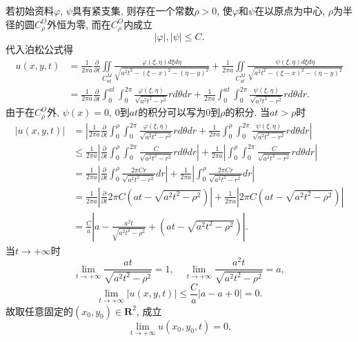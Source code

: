 \documentclass[11pt,a4paper]{article}
\begin{document}
若初始资料$\varphi$, $\psi$具有紧支集, 则存在一个常数$\rho>0$, 使$\varphi$和$\psi$在以原点为中心, $\rho$为半径的圆$C_\rho^O$外恒为零, 而在$C_\rho^O$内成立
$$|\varphi|,|\psi|\leqslant C.$$
代入泊松公式得
\begin{align*}
  u(x,y,t)
   & =\frac{1}{2\pi a}\frac{\partial}{\partial t}\iint\limits_{C_{at}^M}\frac{\varphi(\xi,\eta)d\xi d\eta}{\sqrt{a^2t^2-(\xi-x)^2-(\eta-y)^2}}+
  \frac{1}{2\pi a}\iint\limits_{C_{at}^M}\frac{\psi(\xi,\eta)d\xi d\eta}{\sqrt{a^2t^2-(\xi-x)^2-(\eta-y)^2}}                                    \\
   & =\frac{1}{2\pi a}\frac{\partial}{\partial t}\int_0^{at}\int_0^{2\pi}\frac{\varphi(\xi,\eta)}{\sqrt{a^2t^2-r^2}}rd\theta dr+
  \frac{1}{2\pi a}\int_0^{at}\int_0^{2\pi}\frac{\psi(\xi,\eta)}{\sqrt{a^2t^2-r^2}}rd\theta dr.
\end{align*}
由于在$C_\rho^O$外, $\psi(x)=0$, $0$到$at$的积分可以写为$0$到$\rho$的积分. 当$at>\rho$时
\begin{align*}
  |u(x,y,t)|
   & =\left|\frac{1}{2\pi a}\frac{\partial}{\partial t}\int_0^{\rho}\int_0^{2\pi}\frac{\varphi(\xi,\eta)}{\sqrt{a^2t^2-r^2}}rd\theta dr+
  \frac{1}{2\pi a}\int_0^{\rho}\int_0^{2\pi}\frac{\psi(\xi,\eta)}{\sqrt{a^2t^2-r^2}}rd\theta dr\right|                                                                           \\
   & \leqslant\frac{1}{2\pi a}\left|\frac{\partial}{\partial t}\int_0^{\rho}\int_0^{2\pi}\frac{C}{\sqrt{a^2t^2-r^2}}rd\theta dr\right|+
  \frac{1}{2\pi a}\left|\int_0^{\rho}\int_0^{2\pi}\frac{C}{\sqrt{a^2t^2-r^2}}rd\theta dr \right|                                                                                 \\
   & =\frac{1}{2\pi a}\left|\frac{\partial}{\partial t}\int_0^{\rho}\frac{2\pi Cr}{\sqrt{a^2t^2-r^2}}dr\right|+
  \frac{1}{2\pi a}\left|\int_0^{\rho}\frac{2\pi Cr}{\sqrt{a^2t^2-r^2}}dr \right|                                                                                                 \\
   & =\frac{1}{2\pi a}\left|\frac{\partial}{\partial t}2\pi C\left(at-\sqrt{a^2t^2-\rho^2}\right)\right|+\frac{1}{2\pi a}\left|2\pi C\left(at-\sqrt{a^2t^2-\rho^2}\right)\right| \\
   & =\frac{C}{a}\left|a-\frac{a^2t}{\sqrt{a^2t^2-\rho^2}}+\left(at-\sqrt{a^2t^2-\rho^2}\right)\right|.
\end{align*}
当$t\to+\infty$时
$$\lim_{t\to+\infty}\frac{at}{\sqrt{a^2t^2-\rho^2}}=1,\quad \lim_{t\to+\infty}\frac{a^2t}{\sqrt{a^2t^2-\rho^2}}=a,$$
$$\lim_{t\to+\infty}|u(x,y,t)|\leqslant \frac{C}{a}|a-a+0|=0.$$
故取任意固定的$(x_0,y_0)\in \mathbf{R}^2$, 成立
$$\lim_{t\to+\infty} u(x_0,y_0,t)=0.$$
\end{document}
